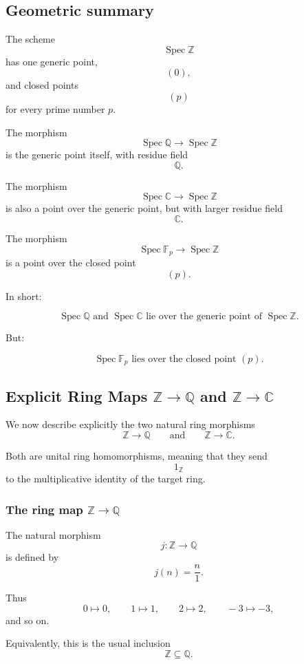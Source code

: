 \documentclass[12pt,a4paper]{article}
\DeclareMathOperator{\Spec}{Spec}
\theoremstyle{notespace}
\begin{document}
\subsection{Geometric summary}

The scheme
\[
\Spec\mathbb Z
\]
has one generic point,
\[
(0),
\]
and closed points
\[
(p)
\]
for every prime number \(p\).

The morphism
\[
\Spec\mathbb Q\to \Spec\mathbb Z
\]
is the generic point itself, with residue field
\[
\mathbb Q.
\]

The morphism
\[
\Spec\mathbb C\to \Spec\mathbb Z
\]
is also a point over the generic point, but with larger residue field
\[
\mathbb C.
\]

The morphism
\[
\Spec\mathbb F_p\to \Spec\mathbb Z
\]
is a point over the closed point
\[
(p).
\]

In short:

\[
\boxed{
	\Spec\mathbb Q
	\text{ and }
	\Spec\mathbb C
	\text{ lie over the generic point of }
	\Spec\mathbb Z.
}
\]

But:

\[
\boxed{
	\Spec\mathbb F_p
	\text{ lies over the closed point }(p).
}
\]


\subsection{Explicit Ring Maps \texorpdfstring{\(\mathbb Z\to \mathbb Q\)}{Z to Q}
	and \texorpdfstring{\(\mathbb Z\to \mathbb C\)}{Z to C}}

We now describe explicitly the two natural ring morphisms
\[
\mathbb Z\longrightarrow \mathbb Q
\qquad\text{and}\qquad
\mathbb Z\longrightarrow \mathbb C.
\]

Both are unital ring homomorphisms, meaning that they send
\[
1_{\mathbb Z}
\]
to the multiplicative identity of the target ring.

\subsubsection*{The ring map \texorpdfstring{\(\mathbb Z\to \mathbb Q\)}{Z to Q}}

The natural morphism
\[
j:\mathbb Z\longrightarrow \mathbb Q
\]
is defined by
\[
j(n)=\frac{n}{1}.
\]

Thus
\[
0\mapsto 0,
\qquad
1\mapsto 1,
\qquad
2\mapsto 2,
\qquad
-3\mapsto -3,
\]
and so on.

Equivalently, this is the usual inclusion
\[
\mathbb Z\subseteq \mathbb Q.
\]
\end{document}
